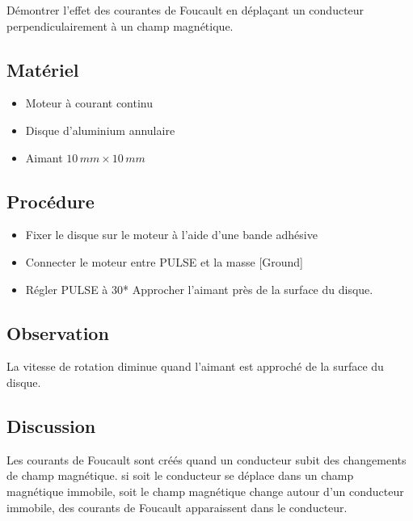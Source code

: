 \documentclass{book}
\begin{document}
Démontrer l'effet des courantes de Foucault en déplaçant un conducteur perpendiculairement à un champ magnétique.




\subsection{Matériel}


\begin{itemize}
  \item Moteur à courant continu
  \item Disque d'aluminium annulaire
  \item Aimant $10\, mm\times10\, mm$
\end{itemize}

\subsection{Procédure}


\begin{itemize}
  \item Fixer le disque sur le moteur à l'aide d'une bande adhésive
  \item Connecter le moteur entre PULSE et la masse [Ground]
  \item Régler PULSE à 30* Approcher l'aimant près de la surface du disque.
\end{itemize}

\subsection{Observation}


La vitesse de rotation diminue quand l'aimant est approché de la surface du disque.

\subsection{Discussion}


Les courants de Foucault sont créés quand un conducteur subit des changements de champ magnétique. si soit le conducteur se déplace dans un champ magnétique immobile, soit le champ magnétique change autour d'un conducteur immobile, des courants de Foucault apparaissent dans le conducteur.



\end{document}
